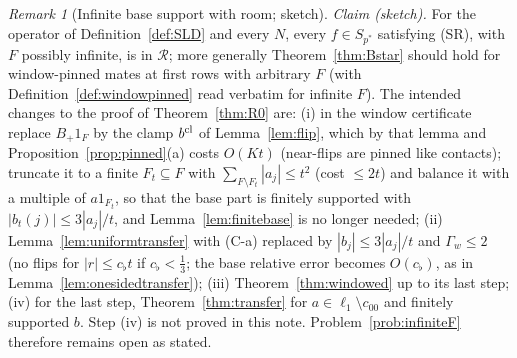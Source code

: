 \documentclass[10pt]{amsart}
\theoremstyle{definition}
\theoremstyle{remark}
\newtheorem{remark}[theorem]{Remark}
\newcommand{\Rec}{\mathcal R}
\begin{document}
\begin{remark}[Infinite base support with room; sketch]\label{rem:Binf}
\emph{Claim (sketch).}  For the operator of Definition~\ref{def:SLD} and
every $N$, every $f\in S_{p^*}$ satisfying \textup{(SR)}, with $F$ possibly
infinite, is in $\Rec$; more generally Theorem~\ref{thm:Bstar} should hold
for window-pinned mates at first rows with arbitrary $F$ (with
Definition~\ref{def:windowpinned} read verbatim for infinite $F$).  The intended
changes to the proof of Theorem~\ref{thm:R0} are: (i) in the window
certificate replace $B_+1_F$ by the clamp $b^{\rm cl}$ of
Lemma~\ref{lem:flip}, which by that lemma and
Proposition~\ref{prop:pinned}(a) costs $O(Kt)$ (near-flips are pinned like
contacts); truncate it to a finite $F_t\subseteq F$ with $\sum_{F\setminus
F_t}|a_j|\le t^2$ (cost $\le2t$) and balance it with a multiple of
$a1_{F_t}$, so that the base part is finitely supported with
$|b_t(j)|\le3|a_j|/t$, and Lemma~\ref{lem:finitebase} is no longer needed;
(ii) Lemma~\ref{lem:uniformtransfer} with (C-a) replaced by
$|b_j|\le3|a_j|/t$ and $\Gamma_w\le2$ (no flips for $|r|\le c_\flat t$ if
$c_\flat<\frac13$; the base relative error becomes $O(c_\flat)$, as in
Lemma~\ref{lem:onesidedtransfer}); (iii) Theorem~\ref{thm:windowed} up to
its last step; (iv) for the last step, Theorem~\ref{thm:transfer} for
$a\in\ell_1\setminus c_{00}$ and finitely supported $b$.  Step (iv) is not
proved in this note.  Problem~\ref{prob:infiniteF} therefore remains open
as stated.
\end{remark}
\end{document}
